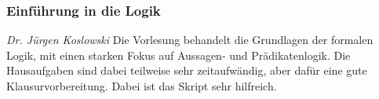 
\subsubsection{Einführung in die Logik}
	\textit{Dr. Jürgen Koslowski}
	Die Vorlesung behandelt die Grundlagen der formalen Logik, mit einen starken Fokus auf Aussagen- und Prädikatenlogik. Die Hausaufgaben sind dabei teilweise sehr zeitaufwändig, aber dafür eine gute Klausurvorbereitung. Dabei ist das Skript sehr hilfreich.